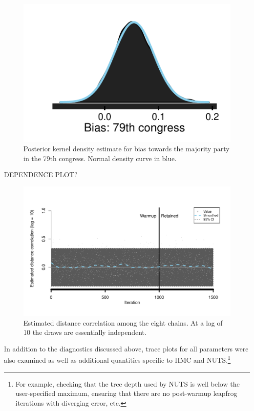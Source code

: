 \begin{figure}[h]
\centering
	\includegraphics[scale=0.75]{sections/figs/example_posterior}
\caption{Posterior kernel density estimate for bias towards the majority party in the 79th congress. Normal density curve in blue.}
\label{fig:ck_example_posterior}
\end{figure}


DEPENDENCE PLOT?


\begin{figure}[h]
\centering
	\includegraphics[scale=0.75]{sections/figs/ck_dependence}
\caption{Estimated distance correlation among the eight chains. At a lag of 10 the draws are essentially independent. }
\label{fig:ck_dependence}
\end{figure}


In addition to the diagnostics discussed above, trace plots for all parameters were also examined as well as additional quantities specific to HMC and NUTS.\footnote{For example, checking that the tree depth used by NUTS is well below the user-specified maximum, ensuring that there are no post-warmup leapfrog iterations with diverging error, etc.}





